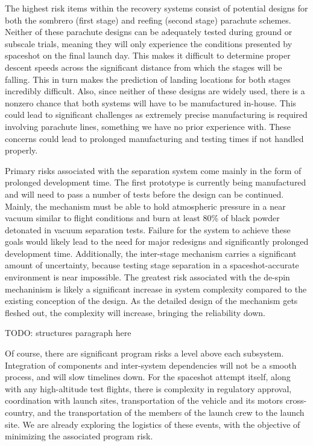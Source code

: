 The highest risk items within the recovery systems consist of potential designs for both the sombrero (first stage) and reefing (second stage) parachute schemes. Neither of these parachute designs can be adequately tested during ground or subscale trials, meaning they will only experience the conditions presented by spaceshot on the final launch day. This makes it difficult to determine proper descent speeds across the significant distance from which the stages will be falling. This in turn makes the prediction of landing locations for both stages incredibly difficult. Also, since neither of these designs are widely used, there is a nonzero chance that both systems will have to be manufactured in-house. This could lead to significant challenges as extremely precise manufacturing is required involving parachute lines, something we have no prior experience with. These concerns could lead to prolonged manufacturing and testing times if not handled properly.

Primary risks associated with the separation system come mainly in the form of prolonged development time. The first prototype is currently being manufactured and will need to pass a number of tests before the design can be continued. Mainly, the mechanism must be able to hold atmospheric pressure in a near vacuum similar to flight conditions and burn at least 80\% of black powder detonated in vacuum separation tests. Failure for the system to achieve these goals would likely lead to the need for major redesigns and significantly prolonged development time. Additionally, the inter-stage mechanism carries a significant amount of uncertainty, because testing stage separation in a spaceshot-accurate environment is near impossible. The greatest risk associated with the de-spin mechaninism is likely a significant increase in system complexity compared to the existing conception of the design. As the detailed design of the mechanism gets fleshed out, the complexity will increase, bringing the reliability down.

TODO: structures paragraph here

Of course, there are significant program risks a level above each subsystem. Integration of components and inter-system dependencies will not be a smooth process, and will slow timelines down. For the spaceshot attempt itself, along with any high-altitude test flights, there is complexity in regulatory approval, coordination with launch sites, transportation of the vehicle and its motors cross-country, and the transportation of the members of the launch crew to the launch site. We are already exploring the logistics of these events, with the objective of minimizing the associated program risk.



